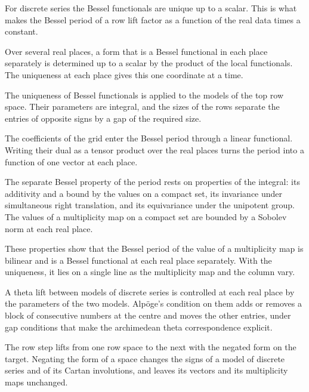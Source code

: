 For discrete series the Bessel functionals are unique up to a scalar. This is
what makes the Bessel period of a row lift factor as a function of the real
data times a constant.

Over several real places, a form that is a Bessel functional in each place
separately is determined up to a scalar by the product of the local
functionals. The uniqueness at each place gives this one coordinate at a time.

The uniqueness of Bessel functionals is applied to the models of the top row
space. Their parameters are integral, and the sizes of the rows separate the
entries of opposite signs by a gap of the required size.

The coefficients of the grid enter the Bessel period through a linear
functional. Writing their dual as a tensor product over the real places turns
the period into a function of one vector at each place.

The separate Bessel property of the period rests on properties of the integral:
its additivity and a bound by the values on a compact set, its invariance under
simultaneous right translation, and its equivariance under the unipotent group.
The values of a multiplicity map on a compact set are bounded by a Sobolev norm
at each real place.

These properties show that the Bessel period of the value of a multiplicity map
is bilinear and is a Bessel functional at each real place separately. With the
uniqueness, it lies on a single line as the multiplicity map and the column
vary.

A theta lift between models of discrete series is controlled at each real place
by the parameters of the two models. Alpöge's condition on them adds or removes
a block of consecutive numbers at the centre and moves the other entries, under
gap conditions that make the archimedean theta correspondence explicit.

The row step lifts from one row space to the next with the negated form on the
target. Negating the form of a space changes the signs of a model of discrete
series and of its Cartan involutions, and leaves its vectors and its
multiplicity maps unchanged.


